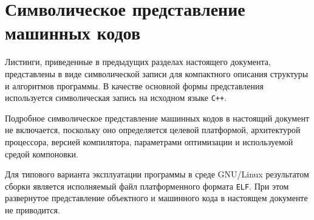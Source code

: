 \section{Символическое представление машинных кодов}

Листинги, приведенные в предыдущих разделах настоящего документа, представлены в
виде символической записи для компактного описания структуры и алгоритмов
программы. В качестве основной формы
представления используется символическая запись на исходном языке
\texttt{C++}.

Подробное символическое представление машинных кодов в настоящий документ не
включается, поскольку оно определяется целевой платформой, архитектурой
процессора, версией компилятора, параметрами оптимизации и используемой
средой компоновки.

Для типового варианта эксплуатации программы в среде GNU/Linux результатом
сборки является исполняемый файл платформенного формата \texttt{ELF}. При этом
развернутое представление объектного и машинного кода в настоящем документе не
приводится.
